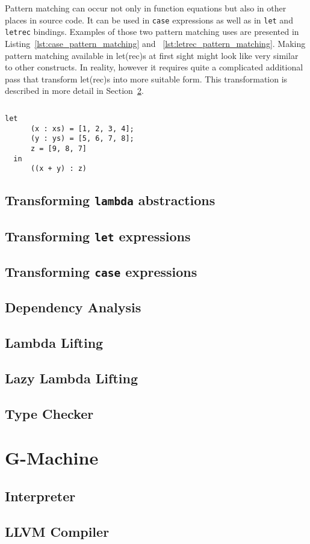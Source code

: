 \documentclass[a4paper]{report}
\begin{document}
Pattern matching can occur not only in function equations but also in other
places in source code. It can be used in \texttt{case} expressions as well as
in \texttt{let} and \texttt{letrec} bindings. Examples of those two pattern
matching uses are presented in Listing~\ref{lst:case_pattern_matching} and
~\ref{lst:letrec_pattern_matching}. Making pattern matching available in
let(rec)s at first sight might look like very similar to other constructs. In
reality, however it requires quite a complicated additional pass that transform
let(rec)s into more suitable form.  This transformation is described in more
detail in Section~\ref{sec:letrec_transform}.

\begin{lstlisting}[label=lst:case_pattern_matching,caption={Pattern matching in
  case expressions.}]
\end{lstlisting}

\begin{lstlisting}[label=lst:letrec_pattern_matching,caption={Pattern matching
  in let(rec) expressions.}]
  let
      (x : xs) = [1, 2, 3, 4];
      (y : ys) = [5, 6, 7, 8];
      z = [9, 8, 7]
  in
      ((x + y) : z)
\end{lstlisting}

\section{Transforming \texttt{lambda} abstractions}
\section{Transforming \texttt{let} expressions}
\label{sec:letrec_transform}
\section{Transforming \texttt{case} expressions}
\section{Dependency Analysis}
\section{Lambda Lifting}
\section{Lazy Lambda Lifting}
\section{Type Checker}


\chapter{G-Machine}
\section{Interpreter}
\section{LLVM Compiler}



\end{document}
